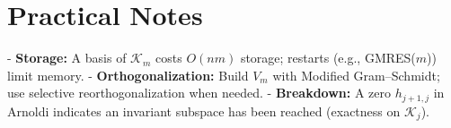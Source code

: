\section{Practical Notes}
- \textbf{Storage:} A basis of $\mathcal{K}_m$ costs $O(nm)$ storage; restarts (e.g., GMRES($m$)) limit memory.
- \textbf{Orthogonalization:} Build $V_m$ with Modified Gram--Schmidt; use selective reorthogonalization when needed.
- \textbf{Breakdown:} A zero $h_{j+1,j}$ in Arnoldi indicates an invariant subspace has been reached (exactness on $\mathcal{K}_j$).
